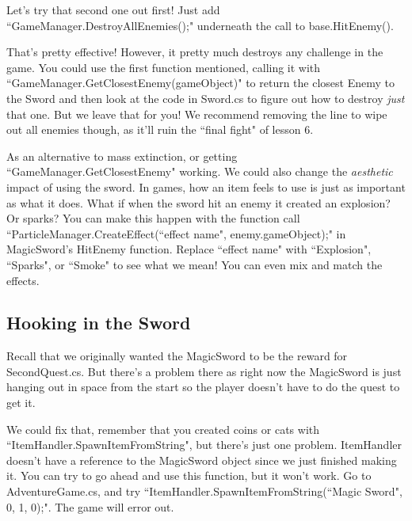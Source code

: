 \documentclass{article}
\begin{document}
Let's try that second one out first! Just add ``GameManager.DestroyAllEnemies();" underneath the call to base.HitEnemy(). 

\noindent{}

That's pretty effective! However, it pretty much destroys any challenge in the game. You could use the first function mentioned, calling it with ``GameManager.GetClosestEnemy(gameObject)" to return the closest Enemy to the Sword and then look at the code in Sword.cs to figure out how to destroy \textit{just} that one. But we leave that for you! We recommend removing the line to wipe out all enemies though, as it'll ruin the ``final fight" of lesson 6.

As an alternative to mass extinction, or getting ``GameManager.GetClosestEnemy" working. We could also change the \textit{aesthetic} impact of using the sword. In games, how an item feels to use is just as important as what it does. What if when the sword hit an enemy it created an explosion? Or sparks? You can make this happen with the function call ``ParticleManager.CreateEffect(``effect name", enemy.gameObject);" in MagicSword's HitEnemy function. Replace ``effect name" with ``Explosion", ``Sparks", or ``Smoke" to see what we mean! You can even mix and match the effects.

\noindent{}

\subsection{Hooking in the Sword}

Recall that we originally wanted the MagicSword to be the reward for SecondQuest.cs. But there's a problem there as right now the MagicSword is just hanging out in space from the start so the player doesn't have to do the quest to get it.

We could fix that, remember that you created coins or cats with ``ItemHandler.SpawnItemFromString", but there's just one problem. ItemHandler doesn't have a reference to the MagicSword object since we just finished making it. You can try to go ahead and use this function, but it won't work. Go to AdventureGame.cs, and try ``ItemHandler.SpawnItemFromString(``Magic Sword", 0, 1, 0);". The game will error out.
\end{document}
